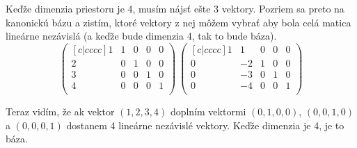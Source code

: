 
Keďže dimenzia priestoru je 4, musím nájsť ešte 3 vektory. Pozriem sa 
preto na kanonickú bázu a zistím, ktoré vektory z nej môžem vybrať aby 
bola celá matica lineárne nezávislá (a keďže bude dimenzia 4, tak to 
bude báza).
\[\begin{pmatrix}[c|cccc]
    1 & 1 & 0 & 0 & 0 \\
    2 & 0 & 1 & 0 & 0 \\
    3 & 0 & 0 & 1 & 0 \\
    4 & 0 & 0 & 0 & 1 \\
\end{pmatrix}
~   
\begin{pmatrix}[c|cccc]
    1 & 1 & 0 & 0 & 0 \\
    0 & -2 & 1 & 0 & 0 \\
    0 & -3 & 0 & 1 & 0 \\
    0 & -4 & 0 & 0 & 1 \\
\end{pmatrix}\]

Teraz vidím, že ak vektor $(1,2,3,4)$ doplním vektormi $(0,1,0,0)$, 
$(0,0,1,0)$ a $(0,0,0,1)$ dostanem 4 lineárne nezávislé vektory. Keďže 
dimenzia je 4, je to báza.

